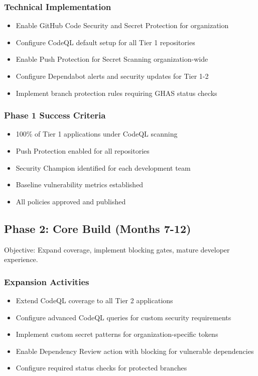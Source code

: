 \documentclass[11pt]{article}
\begin{document}
\subsubsection{Technical Implementation}

\begin{itemize}[leftmargin=*]
\item Enable GitHub Code Security and Secret Protection for organization
\item Configure CodeQL default setup for all Tier 1 repositories
\item Enable Push Protection for Secret Scanning organization-wide
\item Configure Dependabot alerts and security updates for Tier 1-2
\item Implement branch protection rules requiring GHAS status checks
\end{itemize}
\subsubsection{Phase 1 Success Criteria}

\begin{itemize}[leftmargin=*]
\item 100\% of Tier 1 applications under CodeQL scanning
\item Push Protection enabled for all repositories
\item Security Champion identified for each development team
\item Baseline vulnerability metrics established
\item All policies approved and published
\end{itemize}
\subsection{Phase 2: Core Build (Months 7-12)}

Objective: Expand coverage, implement blocking gates, mature developer experience.

\subsubsection{Expansion Activities}

\begin{itemize}[leftmargin=*]
\item Extend CodeQL coverage to all Tier 2 applications
\item Configure advanced CodeQL queries for custom security requirements
\item Implement custom secret patterns for organization-specific tokens
\item Enable Dependency Review action with blocking for vulnerable dependencies
\item Configure required status checks for protected branches
\end{itemize}
\end{document}
